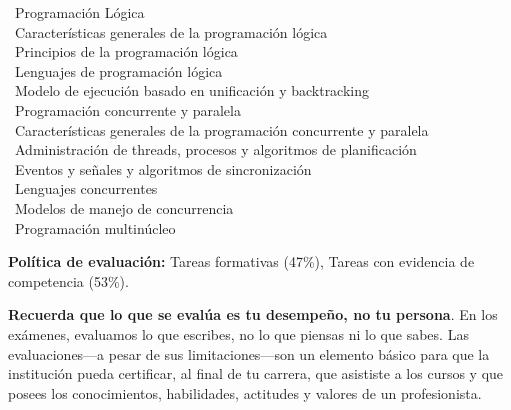 \documentclass[12pt, letterpaper, oneside]{article}
\newcommand{\topic}{{\color{darkgreen}{\Rectangle}}}
\newcommand{\subtopic}{{\enskip \color{darkblue}{\Rectangle}}}
\begin{document}
\begin{center}
\begin{minipage}{5in}
\begin{flushleft}
  \topic ~Programación Lógica \\
  \subtopic ~Características generales de la programación lógica \\
  \subtopic ~Principios de la programación lógica \\
  \subtopic ~Lenguajes de programación lógica \\
  \subtopic ~Modelo de ejecución basado en unificación y backtracking \\
  \topic ~Programación concurrente y paralela \\
  \subtopic ~Características generales de la programación concurrente y paralela \\
  \subtopic ~Administración de threads, procesos y algoritmos de planificación \\
  \subtopic ~Eventos y señales y algoritmos de sincronización \\
  \subtopic ~Lenguajes concurrentes \\
  \subtopic ~Modelos de manejo de concurrencia \\
  \subtopic ~Programación multinúcleo \\

  \end{flushleft}
  \end{minipage}
  \end{center}

  \vspace*{.15in}
  \noindent\textbf{Política de evaluación:}
  Tareas formativas (47\%), Tareas con evidencia de competencia (53\%).
  \vspace*{.15in}

  \noindent\textbf{Recuerda que lo que se evalúa es tu desempeño, no tu persona}.
  En los exámenes, evaluamos lo que escribes, no lo que piensas ni lo que sabes.
  Las evaluaciones---a pesar de sus limitaciones---son un elemento básico para que la institución pueda certificar, al final de tu carrera, que asististe a los cursos y que posees los conocimientos, habilidades, actitudes y valores de un profesionista.

\end{document}
